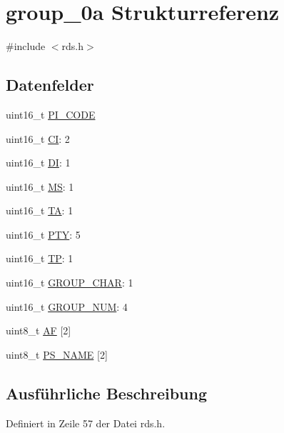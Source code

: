 \hypertarget{structgroup__0a}{}\section{group\+\_\+0a Strukturreferenz}
\label{structgroup__0a}


{\ttfamily \#include $<$rds.\+h$>$}

\subsection*{Datenfelder}
\begin{DoxyCompactItemize}
\item 
uint16\+\_\+t \hyperlink{structgroup__0a_a5cd9b1f6413028425796c1129aa8fd87}{P\+I\+\_\+\+C\+O\+D\+E}
\item 
uint16\+\_\+t \hyperlink{structgroup__0a_aa6fd8556e02ce89fed23057f1cb37e44}{C\+I}\+: 2
\item 
uint16\+\_\+t \hyperlink{structgroup__0a_ad020d0abff338c9c34924a44478ac591}{D\+I}\+: 1
\item 
uint16\+\_\+t \hyperlink{structgroup__0a_a0d87191040df43fdd9f67487d0cc1a45}{M\+S}\+: 1
\item 
uint16\+\_\+t \hyperlink{structgroup__0a_a6de7751205cef4ffcce610399a030892}{T\+A}\+: 1
\item 
uint16\+\_\+t \hyperlink{structgroup__0a_a0474967478fbbc2c71b800d2e0132d45}{P\+T\+Y}\+: 5
\item 
uint16\+\_\+t \hyperlink{structgroup__0a_ab9e634c63b0d95a96716d5f6d7f06d72}{T\+P}\+: 1
\item 
uint16\+\_\+t \hyperlink{structgroup__0a_a66d4119990dc4c3e040a43885e9bb953}{G\+R\+O\+U\+P\+\_\+\+C\+H\+A\+R}\+: 1
\item 
uint16\+\_\+t \hyperlink{structgroup__0a_a9f692e9f76ee88348d426bcd4e9bc70b}{G\+R\+O\+U\+P\+\_\+\+N\+U\+M}\+: 4
\item 
uint8\+\_\+t \hyperlink{structgroup__0a_ae5a8515ae995b21e542b2ad52b20c34e}{A\+F} \mbox{[}2\mbox{]}
\item 
uint8\+\_\+t \hyperlink{structgroup__0a_a80447425671c19133df16d620705bb09}{P\+S\+\_\+\+N\+A\+M\+E} \mbox{[}2\mbox{]}
\end{DoxyCompactItemize}


\subsection{Ausführliche Beschreibung}


Definiert in Zeile 57 der Datei rds.\+h.



